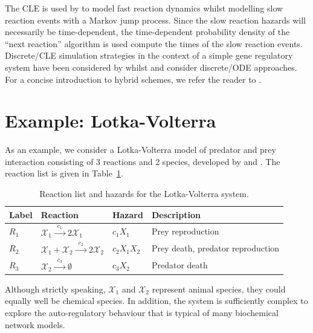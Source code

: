 \documentclass[12pt, DIV12]{scrartcl}
\begin{document}
The CLE is used by \cite{salis2005} to model fast reaction dynamics whilst
modelling slow reaction events with a Markov jump process. Since the slow
reaction hazards will necessarily be time-dependent, the time-dependent
probability density of the ``next reaction'' algorithm is used compute the times
of the slow reaction events. Discrete/CLE simulation strategies in the context
of a simple gene regulatory system have been considered by \cite{higham2011}
whilst \cite{kiehl2004} and \cite{alfonsi2005} consider discrete/ODE approaches.
For a concise introduction to hybrid schemes, we refer the reader to
\cite{Wilkinson06}.

   
\section{Example: Lotka-Volterra}

As an example, we consider a Lotka-Volterra model of predator and prey
interaction consisting of 3 reactions and 2 species, developed by
\cite{lotka1925} and \cite{volterra1926}. The reaction list is given in
Table~\ref{tab:tab2}.
\begin{table}[t]
\centering
\begin{tabular}{@{}llll@{}}
\toprule
Label  & Reaction &  Hazard & Description\\
\midrule
$R_{1}$ & $\mathcal{X}_{1}\xrightarrow{\phantom{a}c_{1}\phantom{a}}  2\mathcal{X}_{1}$ & $c_{1}X_{1}$ & Prey reproduction\\
$R_{2}$ & $\mathcal{X}_{1}+\mathcal{X}_{2}\xrightarrow{\phantom{a}c_{2}\phantom{a}}  2\mathcal{X}_{2}$ & $c_{2}X_{1}X_{2}$ & Prey death, predator reproduction\\
$R_{3}$ & $\mathcal{X}_{2}\xrightarrow{\phantom{a}c_{3}\phantom{a}}  \emptyset$ & $c_{3}X_{2}$ & Predator death\\
\bottomrule
\end{tabular}
\caption{Reaction list and hazards for the Lotka-Volterra system.}\label{tab:tab2}
\end{table} 
Although strictly speaking, $\mathcal{X}_{1}$ and $\mathcal{X}_{2}$ represent
animal species, they could equally well be chemical species. In addition, the
system is sufficiently complex to explore the auto-regulatory behaviour that is
typical of many biochemical network models.
\end{document}
